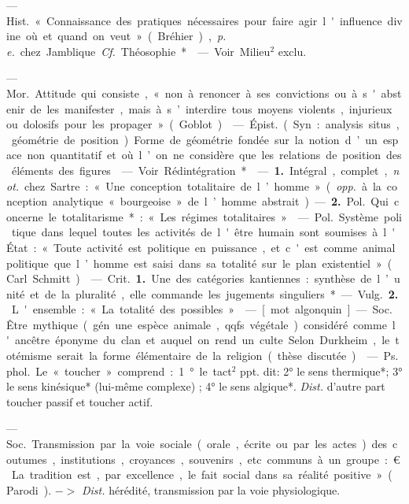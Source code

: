 \begin{itemize}[leftmargin=1cm, label=, itemsep=1pt]
 — \si{Hist.} « Connaissance des
pratiques nécessaires pour faire agir
l'influence divine où et quand on
veut » (Bréhier), {\it p. e.} chez Jamblique.
{\it Cf.} Théosophie*.

 — Voir Milieu$^2$ exclu.

 — \si{Mor.} Attitude qui consiste, « non à renoncer à ses convictions ou à s'abstenir de les manifester, mais à s’interdire tous moyens
violents, injurieux ou dolosifs pour
les propager » (Goblot).

 — \si{Épist.} (Syn. : analysis
situs, géométrie de position). Forme
de géométrie fondée sur la notion
d’un espace non quantitatif et où
l’on ne considère que les relations
de position des éléments des figures.

 — Voir Rédintégration*.

 — {\bf 1.} Intégral, complet,
{\it not.} chez Sartre : « Une conception
totalitaire de l’homme » ({\it opp.} à la
conception analytique « bourgeoise »
de l’homme abstrait). — {\bf 2.} \si{Pol.}
Qui concerne le totalitarisme* : « Les
régimes totalitaires. »

 — \si{Pol.} Système poli
tique dans lequel toutes les activités
de l'être humain sont soumises à
l'État : « Toute activité est politique en puissance, et c'est comme
animal politique que l’homme est
saisi dans sa totalité sur le plan
existentiel » (Carl Schmitt).

 — \si{Crit.} {\bf 1.} Une des catégories
kantiennes : synthèse de l’unité et
de la pluralité, elle commande les
jugements singuliers*.

— \si{Vulg.} {\bf 2.} L'ensemble : « La totalité des possibles. »

 — [mot algonquin] — \si{Soc.} Être
mythique (gén. une espèce animale,
qqfs. végétale) considéré comme
l'ancêtre éponyme du clan et auquel
on rend un culte. Selon Durkheim,
le totémisme serait la forme élémentaire de la religion (thèse discutée).

 — \si{Ps. phol.} Le « toucher »
comprend : 1° le tact$^2$ ppt. dit: 2° le
sens thermique*; 3° le sens kinésique* (lui-même complexe) ; 4° le
sens algique*. {\it Dist.} d'autre part
toucher passif et toucher actif.

 — \si{Soc.} Transmission par
la voie sociale (orale, écrite ou par
les actes) des coutumes, institutions, croyances, souvenirs, etc.
communs à un groupe : € La tradition est, par excellence, le fait social
dans sa réalité positive » (Parodi).
$->$ {\it Dist.} hérédité, transmission par
la voie physiologique.


\end{itemize}
